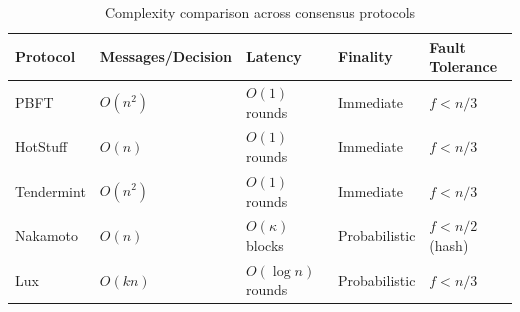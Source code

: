 \begin{table}[h]
\centering
\caption{Complexity comparison across consensus protocols}
\label{tab:complexity}
\begin{tabular}{@{}lllll@{}}
\toprule
Protocol & Messages/Decision & Latency & Finality & Fault Tolerance \\
\midrule
PBFT & $O(n^2)$ & $O(1)$ rounds & Immediate & $f < n/3$ \\
HotStuff & $O(n)$ & $O(1)$ rounds & Immediate & $f < n/3$ \\
Tendermint & $O(n^2)$ & $O(1)$ rounds & Immediate & $f < n/3$ \\
Nakamoto & $O(n)$ & $O(\kappa)$ blocks & Probabilistic & $f < n/2$ (hash) \\
Lux & $O(kn)$ & $O(\log n)$ rounds & Probabilistic & $f < n/3$ \\
\bottomrule
\end{tabular}
\end{table}

